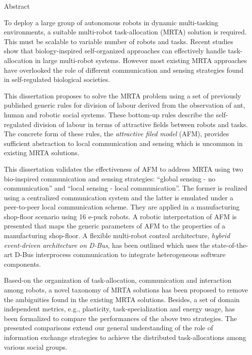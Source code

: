 \begin{Large}
Abstract\\
\end{Large}
\newline
To deploy a large group of autonomous robots in dynamic multi-tasking environments, a suitable multi-robot task-allocation (MRTA) solution is required. This must be scalable to variable number of robots and tasks. Recent studies show that biology-inspired self-organized approaches can effectively handle task-allocation in large multi-robot systems. However most existing MRTA approaches have overlooked the role of different communication and sensing strategies found in self-regulated biological societies.

This dissertation proposes to solve the MRTA problem using a set of previously published generic rules for division of labour derived from the observation of ant, human and robotic social systems. These bottom-up rules describe the self-regulated division of labour in terms of attractive fields between robots and tasks. The concrete form of these rules, the \textit{attractive filed model} (AFM), provides sufficient abstraction to local communication and sensing which is uncommon in existing MRTA solutions. 

This dissertation validates the effectiveness of AFM to address MRTA  using two bio-inspired communication and sensing strategies: ``global sensing - no communication'' and ``local sensing - local communication''. The former is realized using a centralized communication system and the latter is emulated under a peer-to-peer local communication scheme. They are applied in a  manufacturing shop-floor scenario using 16 e-puck robots. A robotic interpretation of AFM is presented that maps the generic parameters of AFM to the properties of a manufacturing shop-floor. A flexible multi-robot control architecture, \textit{hybrid event-driven architecture on D-Bus}, has been outlined which uses the state-of-the-art D-Bus interprocess communication  to integrate heterogeneous software components. 

Based-on the organization of task-allocation, communication and interaction among robots, a  novel taxonomy of MRTA solutions has been proposed to remove the ambiguities found in the existing MRTA solutions. Besides, a set of domain independent metrics, e.g., plasticity, task-specialization and energy usage, has been formalized to compare the performances of the above two strategies. The presented comparisons extend our general understanding of the role of information exchange strategies to achieve the distributed task-allocations among various social groups.